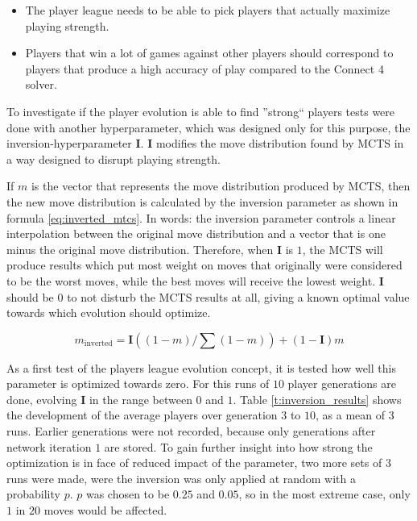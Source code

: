 \documentclass[12pt,onecolumn,oneside,titlepage]{article}
\begin{document}
\begin{itemize}
 \item The player league needs to be able to pick players that actually maximize playing strength.
 \item Players that win a lot of games against other players should correspond to players that produce a high accuracy of play compared to the Connect 4 solver.
\end{itemize}

To investigate if the player evolution is able to find ''strong`` players tests were done with another hyperparameter, which was designed only for this purpose, the inversion-hyperparameter $\mathbf{I}$.
$\mathbf{I}$ modifies the move distribution found by MCTS in a way designed to disrupt playing strength.

If $m$ is the vector that represents the move distribution produced by MCTS, then the new move distribution is calculated by the inversion parameter as shown in formula \ref{eq:inverted_mtcs}.
In words: the inversion parameter controls a linear interpolation between the original move distribution and a vector that is one minus the original move distribution. Therefore, when $\mathbf{I}$ is $1$, the MCTS will produce results which put most weight on moves that originally
were considered to be the worst moves, while the best moves will receive the lowest weight. $\mathbf{I}$ should be $0$ to not disturb the MCTS results at all, giving a known optimal value towards which evolution should optimize.

\begin{equation}
 m_\text{inverted} = \mathbf{I}((1 - m) / \sum(1 - m)) + (1 - \mathbf{I}) m \label{eq:inverted_mtcs}
\end{equation}

As a first test of the players league evolution concept, it is tested how well this parameter is optimized towards zero. For this runs of $10$ player generations are done, evolving $\mathbf{I}$ in the range between $0$ and $1$.
Table \ref{t:inversion_results} shows the development of the average players over generation $3$ to $10$, as a mean of $3$ runs. Earlier generations were not recorded, because only generations after network iteration $1$ are stored.
To gain further insight into how strong the optimization is in face of reduced impact of the parameter, two more sets of $3$ runs were made, were the inversion was only applied at random with a probability $p$. $p$ was chosen to be $0.25$ and $0.05$, so in the most extreme case,
only $1$ in $20$ moves would be affected.
\end{document}
